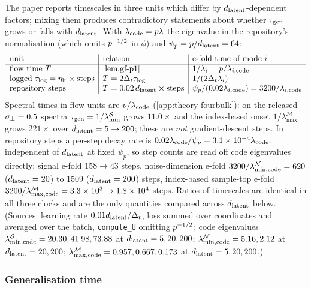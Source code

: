\begin{remark}\label{rem:clock-p1}
The paper reports timescales in three units which differ by $d_{\mathrm{latent}}$-dependent factors; mixing them produces contradictory statements about whether $\tau_{\mathrm{gen}}$ grows or falls with $d_{\mathrm{latent}}$. With $\lambda_{\rm code}=p\lambda$ the eigenvalue in the repository's normalisation (which omits $p^{-1/2}$ in $\phi$) and $\psi_p=p/d_{\mathrm{latent}}=64$:
\[
\begin{array}{l|l|l}
\text{unit} & \text{relation} & \text{e-fold time of mode }i\\\hline
\text{flow time }T & \text{\cref{lem:gf-p1}} & 1/\lambda_i=\pwidth/\lambda_{i,\rm code}\\
\text{logged }\tau_{\rm log}=\eta_{\rm lr}\times\text{steps} & T=2\Delta_t\tau_{\rm log} & 1/(2\Delta_t\lambda_i)\\
\text{repository steps} & T=0.02\,\dlat\times\text{steps} & \psi_p/(0.02\lambda_{i,\rm code})=3200/\lambda_{i,\rm code}
\end{array}
\]
Spectral times in flow units are $p/\lambda_{\rm code}$ (\cref{app:theory-fourbulk}): on the released $\sigma_{\perp}=0.5$ spectra $\tau_{\mathrm{gen}}=1/\lambda^{\mathcal S}_{\min}$ grows $11.0\times$ and the index-based onset $1/\lambda^{\mathcal M}_{\max}$ grows $221\times$ over $d_{\mathrm{latent}}=5\to200$; these are \emph{not} gradient-descent steps. In repository steps a per-step decay rate is $0.02\lambda_{\rm code}/\psi_p=3.1\times10^{-4}\lambda_{\rm code}$, independent of $d_{\mathrm{latent}}$ at fixed $\psi_p$, so step counts are read off code eigenvalues directly: signal e-fold $158\to43$ steps, noise-dimension e-fold $3200/\lambda^{\mathcal N}_{\min,\rm code}=620$ ($d_{\mathrm{latent}}=20$) to $1509$ ($d_{\mathrm{latent}}=200$) steps, index-based sample-top e-fold $3200/\lambda^{\mathcal M}_{\max,\rm code}=3.3\times10^3\to1.8\times10^4$ steps. Ratios of timescales are identical in all three clocks and are the only quantities compared across $d_{\mathrm{latent}}$ below. (Sources: learning rate $0.01d_{\mathrm{latent}}/\Delta_t$, loss summed over coordinates and averaged over the batch, \texttt{compute\_U} omitting $p^{-1/2}$; code eigenvalues $\lambda^{\mathcal S}_{\min,\rm code}=20.30,41.98,73.88$ at $d_{\mathrm{latent}}=5,20,200$; $\lambda^{\mathcal N}_{\min,\rm code}=5.16,2.12$ at $d_{\mathrm{latent}}=20,200$; $\lambda^{\mathcal M}_{\max,\rm code}=0.957,0.667,0.173$ at $d_{\mathrm{latent}}=5,20,200$.)
\end{remark}

\subsubsection{Generalisation time}

